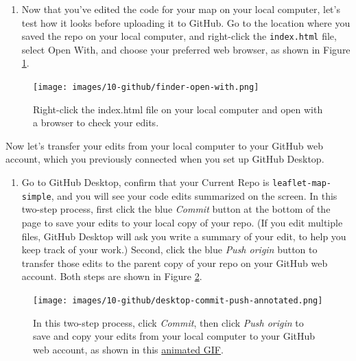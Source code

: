 \documentclass[
  english,
]{book}
\providecommand{\tightlist}{%
  \setlength{\itemsep}{0pt}\setlength{\parskip}{0pt}}
\begin{document}
\begin{enumerate}
\def\labelenumi{\arabic{enumi}.}
\setcounter{enumi}{10}
\tightlist
\item
  Now that you've edited the code for your map on your local computer, let's test how it looks before uploading it to GitHub. Go to the location where you saved the repo on your local computer, and right-click the \texttt{index.html} file, select Open With, and choose your preferred web browser, as shown in Figure \ref{fig:finder-open-with}.
\end{enumerate}



\begin{figure}
\centering
\texttt{[image: images/10-github/finder-open-with.png]}
\caption{\label{fig:finder-open-with}Right-click the index.html file on your local computer and open with a browser to check your edits.}
\end{figure}

Now let's transfer your edits from your local computer to your GitHub web account, which you previously connected when you set up GitHub Desktop.

\begin{enumerate}
\def\labelenumi{\arabic{enumi}.}
\setcounter{enumi}{11}
\tightlist
\item
  Go to GitHub Desktop, confirm that your Current Repo is \texttt{leaflet-map-simple}, and you will see your code edits summarized on the screen. In this two-step process, first click the blue \emph{Commit} button at the bottom of the page to save your edits to your local copy of your repo. (If you edit multiple files, GitHub Desktop will ask you write a summary of your edit, to help you keep track of your work.) Second, click the blue \emph{Push origin} button to transfer those edits to the parent copy of your repo on your GitHub web account. Both steps are shown in Figure \ref{fig:desktop-commit-push}.
\end{enumerate}



\begin{figure}
\centering
\texttt{[image: images/10-github/desktop-commit-push-annotated.png]}
\caption{\label{fig:desktop-commit-push}In this two-step process, click \emph{Commit}, then click \emph{Push origin} to save and copy your edits from your local computer to your GitHub web account, as shown in this \href{https://handsondataviz.org/images/10-github/desktop-commit-push.gif}{animated GIF}.}
\end{figure}
\end{document}
